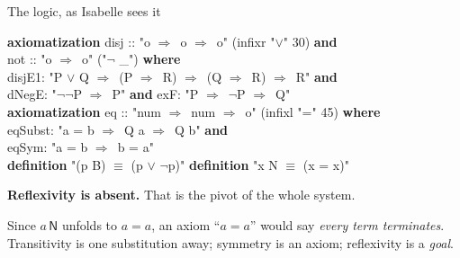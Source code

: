 \documentclass[aspectratio=169,11pt]{beamer}
\newcommand{\im}{\ensuremath{\Longrightarrow}}
\newcommand{\code}[1]{{\ttfamily\footnotesize #1}}
\newcommand{\key}[1]{{\color{accent}\textbf{#1}}}
\begin{document}
\begin{frame}{The logic, as Isabelle sees it}
  \vspace{0.2em}
  \begin{flushleft}\code{%
    \key{axiomatization} disj :: "o \im\ o \im\ o" (infixr "$\vee$" 30) \key{and}\\
    \phantom{ax}not :: "o \im\ o" ("$\neg$ \_") \key{where}\\
    \phantom{axax}disjE1: "P $\vee$ Q \im\ (P \im\ R) \im\ (Q \im\ R) \im\ R" \key{and}\\
    \phantom{axax}dNegE: "$\neg\neg$P \im\ P" \key{and} exF: "P \im\ $\neg$P \im\ Q"\\[0.9em]
    \key{axiomatization} eq :: "num \im\ num \im\ o" (infixl "=" 45) \key{where}\\
    \phantom{axax}eqSubst: "a = b \im\ Q a \im\ Q b" \key{and}\\
    \phantom{axax}eqSym: "a = b \im\ b = a"\\[0.9em]
    \key{definition} "(p B) $\equiv$ (p $\vee$ $\neg$p)" \qquad
    \key{definition} "x N $\equiv$ (x = x)"%
  }\end{flushleft}
  \vfill
  \pause
  \begin{center}
    \key{Reflexivity is absent.} That is the pivot of the whole system.
  \end{center}
  \begin{center}\small
    Since $a\,\mathsf{N}$ unfolds to $a = a$, an axiom ``$a = a$'' would say
    \emph{every term terminates}.\\
    Transitivity is one substitution away; symmetry is an axiom; reflexivity is a
    \emph{goal}.
  \end{center}
  \vfill
\end{frame}
\end{document}
